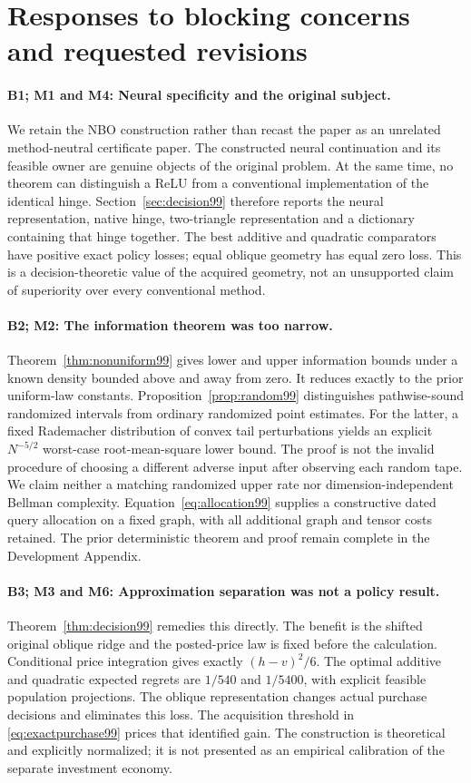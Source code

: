 \documentclass[ecta,nameyear,draft]{econsocart}
\begin{document}
\section{Responses to blocking concerns and requested revisions}
\paragraph{B1; M1 and M4: Neural specificity and the original subject.}
We retain the NBO construction rather than recast the paper as an unrelated method-neutral certificate paper. The constructed neural continuation and its feasible owner are genuine objects of the original problem. At the same time, no theorem can distinguish a ReLU from a conventional implementation of the identical hinge. Section~\ref{sec:decision99} therefore reports the neural representation, native hinge, two-triangle representation and a dictionary containing that hinge together. The best additive and quadratic comparators have positive exact policy losses; equal oblique geometry has equal zero loss. This is a decision-theoretic value of the acquired geometry, not an unsupported claim of superiority over every conventional method.

\paragraph{B2; M2: The information theorem was too narrow.}
Theorem~\ref{thm:nonuniform99} gives lower and upper information bounds under a known density bounded above and away from zero. It reduces exactly to the prior uniform-law constants. Proposition~\ref{prop:random99} distinguishes pathwise-sound randomized intervals from ordinary randomized point estimates. For the latter, a fixed Rademacher distribution of convex tail perturbations yields an explicit $N^{-5/2}$ worst-case root-mean-square lower bound. The proof is not the invalid procedure of choosing a different adverse input after observing each random tape. We claim neither a matching randomized upper rate nor dimension-independent Bellman complexity. Equation~\eqref{eq:allocation99} supplies a constructive dated query allocation on a fixed graph, with all additional graph and tensor costs retained. The prior deterministic theorem and proof remain complete in the Development Appendix.

\paragraph{B3; M3 and M6: Approximation separation was not a policy result.}
Theorem~\ref{thm:decision99} remedies this directly. The benefit is the shifted original oblique ridge and the posted-price law is fixed before the calculation. Conditional price integration gives exactly $(h-v)^2/6$. The optimal additive and quadratic expected regrets are $1/540$ and $1/5400$, with explicit feasible population projections. The oblique representation changes actual purchase decisions and eliminates this loss. The acquisition threshold in \eqref{eq:exactpurchase99} prices that identified gain. The construction is theoretical and explicitly normalized; it is not presented as an empirical calibration of the separate investment economy.
\end{document}
